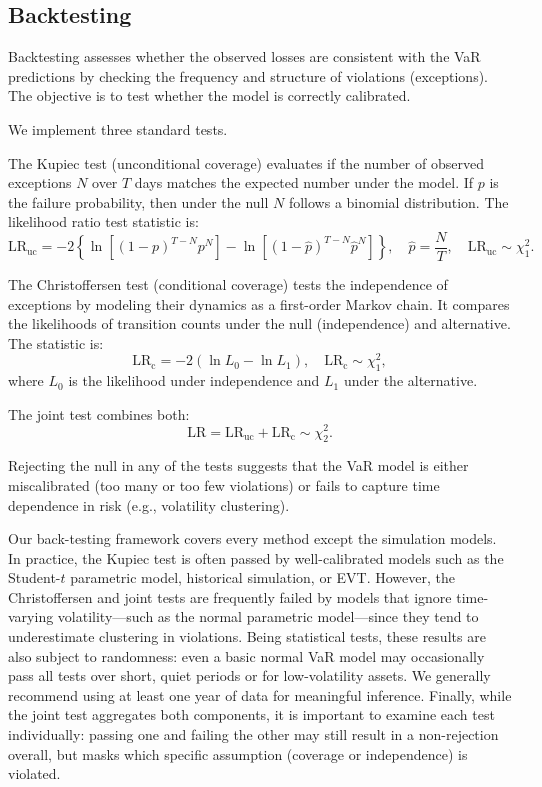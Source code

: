 \documentclass[12pt]{article}
\begin{document}
\subsection{Backtesting}


Backtesting assesses whether the observed losses are consistent with the VaR predictions by checking the frequency and structure of violations (exceptions). The objective is to test whether the model is correctly calibrated.

We implement three standard tests.

The Kupiec test (unconditional coverage) evaluates if the number of observed exceptions $N$ over $T$ days matches the expected number under the model. If $p$ is the failure probability, then under the null $N$ follows a binomial distribution. The likelihood ratio test statistic is:
\[
\text{LR}_{\text{uc}} = -2 \left\{ \ln\left[(1 - p)^{T - N} p^N \right] - \ln\left[(1 - \hat{p})^{T - N} \hat{p}^N \right] \right\}, \quad \hat{p} = \frac{N}{T}, \quad \text{LR}_{\text{uc}} \sim \chi^2_1.
\]

The Christoffersen test (conditional coverage) tests the independence of exceptions by modeling their dynamics as a first-order Markov chain. It compares the likelihoods of transition counts under the null (independence) and alternative. The statistic is:
\[
\text{LR}_{\text{c}} = -2 (\ln L_0 - \ln L_1), \quad \text{LR}_{\text{c}} \sim \chi^2_1,
\]
where $L_0$ is the likelihood under independence and $L_1$ under the alternative.

The joint test combines both:
\[
\text{LR} = \text{LR}_{\text{uc}} + \text{LR}_{\text{c}} \sim \chi^2_2.
\]

Rejecting the null in any of the tests suggests that the VaR model is either miscalibrated (too many or too few violations) or fails to capture time dependence in risk (e.g., volatility clustering).

Our back-testing framework covers every method except the simulation models. 
In practice, the Kupiec test is often passed by well-calibrated models such as the Student-$t$ parametric model, historical simulation, or EVT. However, the Christoffersen and joint tests are frequently failed by models that ignore time-varying volatility—such as the normal parametric model—since they tend to underestimate clustering in violations. Being statistical tests, these results are also subject to randomness: even a basic normal VaR model may occasionally pass all tests over short, quiet periods or for low-volatility assets. We generally recommend using at least one year of data for meaningful inference. Finally, while the joint test aggregates both components, it is important to examine each test individually: passing one and failing the other may still result in a non-rejection overall, but masks which specific assumption (coverage or independence) is violated.
\end{document}
